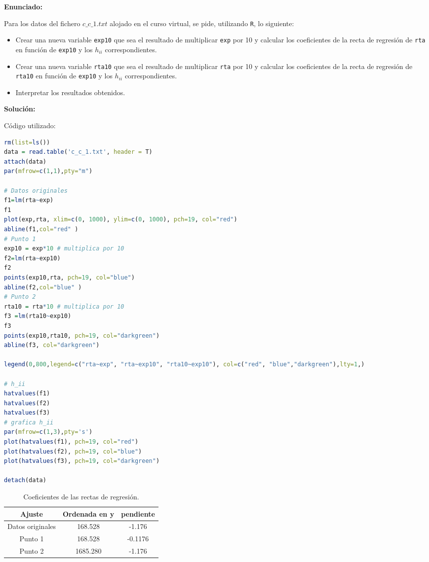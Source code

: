 \documentclass[a4paper]{article}
\begin{document}
\textbf{Enunciado:}\par
Para los datos del fichero $c\_c\_1.txt$ alojado en el curso virtual, se pide, utilizando \verb|R|, lo siguiente:
\begin{itemize}
    \item Crear una nueva variable \verb|exp10| que sea el resultado de multiplicar \verb|exp| por 10 y calcular los coeficientes de la recta de regresión de \verb|rta| en función de \verb|exp10| y los $h_{ii}$ correspondientes.
    \item Crear una nueva variable \verb|rta10| que sea el resultado de multiplicar \verb|rta| por 10 y calcular los coeficientes de la recta de regresión de \verb|rta10| en función de \verb|exp10| y los $h_{ii}$ correspondientes.
    \item Interpretar los resultados obtenidos.
\end{itemize}
\textbf{Solución:}\par
Código utilizado:\par
\begin{lstlisting}[language=R]
rm(list=ls())
data = read.table('c_c_1.txt', header = T)
attach(data)
par(mfrow=c(1,1),pty="m")

# Datos originales  
f1=lm(rta~exp)
f1
plot(exp,rta, xlim=c(0, 1000), ylim=c(0, 1000), pch=19, col="red")
abline(f1,col="red" )
# Punto 1
exp10 = exp*10 # multiplica por 10
f2=lm(rta~exp10)
f2
points(exp10,rta, pch=19, col="blue")
abline(f2,col="blue" )
# Punto 2 
rta10 = rta*10 # multiplica por 10
f3 =lm(rta10~exp10)
f3
points(exp10,rta10, pch=19, col="darkgreen")
abline(f3, col="darkgreen")

legend(0,800,legend=c("rta~exp", "rta~exp10", "rta10~exp10"), col=c("red", "blue","darkgreen"),lty=1,)

# h_ii
hatvalues(f1)
hatvalues(f2)
hatvalues(f3)
# grafica h_ii
par(mfrow=c(1,3),pty='s')
plot(hatvalues(f1), pch=19, col="red")
plot(hatvalues(f2), pch=19, col="blue")
plot(hatvalues(f3), pch=19, col="darkgreen")

detach(data)
\end{lstlisting}
\begin{table}
    \centering
    \begin{tabular}{ c  c  c }
    Ajuste & Ordenada en y &  pendiente \\ \hline
    Datos originales & 168.528   &    -1.176 \\
    Punto 1 & 168.528   &   -0.1176 \\
    Punto 2 & 1685.280 & -1.176 \\
    \end{tabular}
    \caption{\label{tab:51}Coeficientes de las rectas de regresión.}
\end{table}
\end{document}
